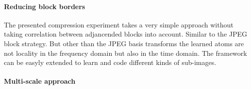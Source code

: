 \paragraph{Reducing block borders} The presented compression experiment
takes a very simple approach without taking correlation between adjancended
blocks into account. Similar to the JPEG block strategy. But other than
the JPEG basis transforms the learned atoms are not locality in the frequency
domain but also in the time domain.
The framework can be easyly extended to learn and code different
kinds of sub-images.

\paragraph{Multi-scale approach}







